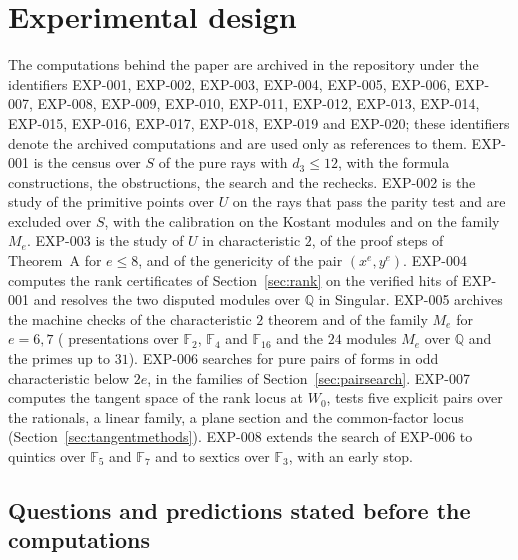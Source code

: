 \documentclass[11pt]{article}
\theoremstyle{definition}
\theoremstyle{remark}
\newcommand{\EXP}[1]{\mbox{EXP-#1}}
\newcommand{\Q}{\mathbb{Q}}
\newcommand{\F}{\mathbb{F}}
\begin{document}
\section{Experimental design}
\label{sec:expdesign}

The computations behind the paper are archived in the repository under the identifiers \EXP{001}, \EXP{002}, \EXP{003}, \EXP{004}, \EXP{005}, \EXP{006}, \EXP{007}, \EXP{008}, \EXP{009}, \EXP{010}, \EXP{011}, \EXP{012}, \EXP{013}, \EXP{014}, \EXP{015}, \EXP{016}, \EXP{017}, \EXP{018}, \EXP{019} and \EXP{020}; these identifiers denote the archived computations and are used only as references to them. \EXP{001} is the census over $S$ of the \nrays{} pure rays with $d_3\le12$, with the formula constructions, the obstructions, the search and the rechecks. \EXP{002} is the study of the primitive points over $U$ on the rays that pass the parity test and are excluded over $S$, with the calibration on the Kostant modules and on the family $M_e$. \EXP{003} is the study of $U$ in characteristic $2$, of the proof steps of Theorem~A for $e\le8$, and of the genericity of the pair $(x^e,y^e)$. \EXP{004} computes the rank certificates of Section~\ref{sec:rank} on the \nfourHits{} verified hits of \EXP{001} and resolves the two disputed modules over $\Q$ in Singular. \EXP{005} archives the machine checks of the characteristic $2$ theorem and of the family $M_e$ for $e=6,7$ (\nfiveCasesAll{} presentations over $\F_2$, $\F_4$ and $\F_{16}$ and the $24$ modules $M_e$ over $\Q$ and the primes up to $31$). \EXP{006} searches for pure pairs of forms in odd characteristic below $2e$, in the families of Section~\ref{sec:pairsearch}. \EXP{007} computes the tangent space of the rank locus at $W_0$, tests five explicit pairs over the rationals, a linear family, a plane section and the common-factor locus (Section~\ref{sec:tangentmethods}). \EXP{008} extends the search of \EXP{006} to quintics over $\F_5$ and $\F_7$ and to sextics over $\F_3$, with an early stop.

\subsection{Questions and predictions stated before the computations}
\end{document}
